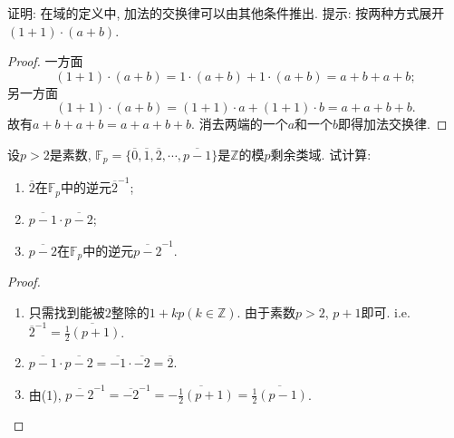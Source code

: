 \begin{problem}\label{ex:1.1.5}
    证明: 在域的定义中, 加法的交换律可以由其他条件推出. 提示: 按两种方式展开$(1 + 1) \cdot (a + b)$.
\end{problem}

\begin{proof}
    一方面
    \[
        (1 + 1) \cdot (a + b) = 1 \cdot (a + b) + 1 \cdot (a + b) = a + b + a + b;
    \]
    另一方面
    \[
        (1 + 1) \cdot (a + b) = (1 + 1) \cdot a + (1 + 1) \cdot b = a + a + b + b.
    \]
    故有$a + b + a + b = a + a + b + b$. 消去两端的一个$a$和一个$b$即得加法交换律.
\end{proof}

\begin{problem}[*]
    设$p > 2$是素数, $\mathbb{F}_p = \{\overline{0}, \overline{1}, \overline{2}, \cdots, \overline{p-1}\}$是$\mathbb{Z}$的模$p$剩余类域. 试计算:
    \begin{enumerate}[(1)]
        \item $\overline{2}$在$\mathbb{F}_p$中的逆元$\overline{2}^{-1}$;
        \item $\overline{p - 1} \cdot \overline{p - 2}$;
        \item $\overline{p - 2}$在$\mathbb{F}_p$中的逆元$\overline{p-2}^{-1}$.
    \end{enumerate}
\end{problem}

\begin{proof}
    \begin{enumerate}[(1)]
        \item 只需找到能被$2$整除的$1 + kp(k \in \mathbb{Z})$. 由于素数$p > 2$, $p + 1$即可. i.e. $\overline{2}^{-1} = \overline{\frac12(p + 1)}$.
        \item $\overline{p - 1} \cdot \overline{p - 2} = \overline{-1} \cdot \overline{-2} = \overline{2}$.
        \item 由(1), $\overline{p - 2}^{-1} = \overline{-2}^{-1} = \overline{-\frac12(p + 1)} = \overline{\frac12(p - 1)}$.
    \end{enumerate}
\end{proof}
    